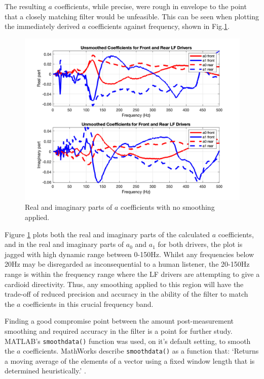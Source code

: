 \documentclass{report}
\begin{document}
            The resulting $a$ coefficients, while precise, were rough in envelope to the point that a closely matching filter would be unfeasible.
            This can be seen when plotting the immediately derived $a$ coefficients against frequency, shown in Fig.\ref{acoeffsNoSmooth}.

            \begin{figure}[H]
                \centering
                \includegraphics[scale=0.35]{figs/acoeffsNoSmooth.png}%
                \caption{Real and imaginary parts of $a$ coefficients with no smoothing applied.}
                \label{acoeffsNoSmooth}
            \end{figure}

            Figure \ref{acoeffsNoSmooth} plots both the real and imaginary parts of the calculated $a$ coefficients, and in the real and imaginary parts of $a_0$ and $a_1$ for both drivers, the plot is jagged with high dynamic range between 0-150Hz.
            Whilst any frequencies below 20Hz may be disregarded as inconsequential to a human listener, the 20-150Hz range is within the frequency range where the LF drivers are attempting to give a cardioid directivity.
            Thus, any smoothing applied to this region will have the trade-off of reduced precision and accuracy in the ability of the filter to match the $a$ coefficients in this crucial frequency band.
            
            Finding a good compromise point between the amount post-measurement smoothing and required accuracy in the filter is a point for further study.
            MATLAB's \texttt{smoothdata()} function was used, on it's default setting, to smooth the $a$ coefficients.
            MathWorks describe \texttt{smoothdata()} as a function that: `Returns a moving average of the elements of a vector using a fixed window length that is determined heuristically.' \cite{smoothdata}.
\end{document}
